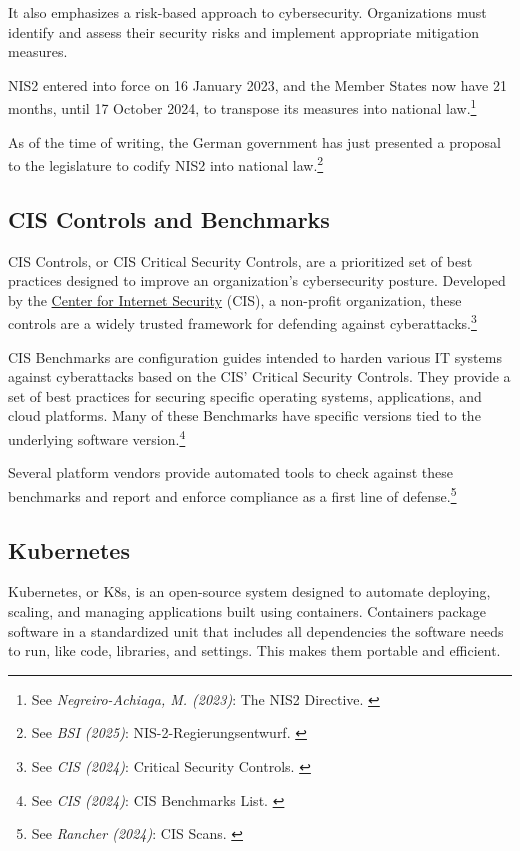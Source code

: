 It also emphasizes a risk-based approach to cybersecurity. Organizations must identify and assess their security risks and implement appropriate mitigation measures.

NIS2 entered into force on 16 January 2023, and the Member States now have 21 months, until 17 October 2024, to transpose its measures into national law.\footnote{See \textit{Negreiro-Achiaga, M. (2023)}: The NIS2 Directive. \cite{nisBrief}}

As of the time of writing, the German government has just presented a proposal to the legislature to codify NIS2 into national law.\footnote{See \textit{BSI (2025)}: NIS-2-Regierungsentwurf. \cite{presseNis2}}

\subsection{CIS Controls and Benchmarks}

CIS Controls, or CIS Critical Security Controls, are a prioritized set of best practices designed to improve an organization's cybersecurity posture. Developed by the \href{https://www.cisecurity.org/}{Center for Internet Security} (CIS), a non-profit organization, these controls are a widely trusted framework for defending against cyberattacks.\footnote{See \textit{CIS (2024)}: Critical Security Controls. \cite{cisControls}}

CIS Benchmarks are configuration guides intended to harden various IT systems against cyberattacks based on the CIS' Critical Security Controls. They provide a set of best practices for securing specific operating systems, applications, and cloud platforms. Many of these Benchmarks have specific versions tied to the underlying software version.\footnote{See \textit{CIS (2024)}: CIS Benchmarks List. \cite{cisBenchmarks}}

Several platform vendors provide automated tools to check against these benchmarks and report and enforce compliance as a first line of defense.\footnote{See \textit{Rancher (2024)}: CIS Scans. \cite{rancherBenchmarks}}

\subsection{Kubernetes}

Kubernetes, or K8s, is an open-source system designed to automate deploying, scaling, and managing applications built using containers. Containers package software in a standardized unit that includes all dependencies the software needs to run, like code, libraries, and settings. This makes them portable and efficient.

